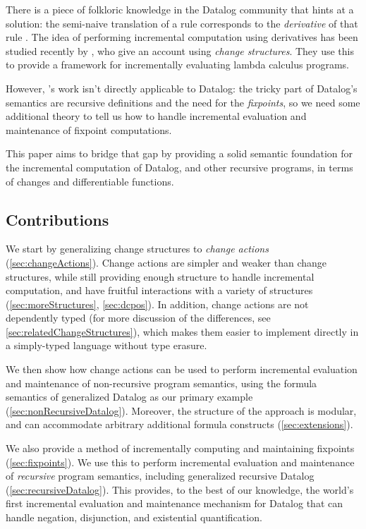 There is a piece of folkloric knowledge in the Datalog community that hints at a
solution: the semi-naive translation of a rule corresponds to the
\emph{derivative} of that rule \autocites{bancilhon1986naive}[section
3.2.2]{bancilhon1986amateur}. The idea of performing incremental computation using derivatives has been
studied recently by \textcite{cai2014changes}, who give an account using
\emph{change structures}. They use this to provide a framework for incrementally evaluating lambda calculus programs.

However, \citeauthor{cai2014changes}'s work isn't directly applicable to Datalog: the tricky part
of Datalog's semantics are recursive definitions and the need for the
\emph{fixpoints}, so we need some additional theory to tell us how to
handle incremental evaluation and maintenance of fixpoint computations.

This paper aims to bridge that gap by providing a solid semantic foundation for the incremental
computation of Datalog, and other recursive programs, in terms of changes and
differentiable functions.

\subsection{Contributions}

We start by generalizing change structures to
\emph{change actions} (\cref{sec:changeActions}). Change actions are simpler and weaker than change
structures, while still providing enough structure to handle incremental
computation, and have fruitful
interactions with a variety of structures (\cref{sec:moreStructures},
\cref{sec:dcpos}). In addition, change actions are not dependently typed (for
more discussion of the differences, see \cref{sec:relatedChangeStructures}),
which makes them easier to implement directly in a simply-typed language without
type erasure.

We then show how change actions can be used to perform incremental evaluation and maintenance
of non-recursive program semantics, using the formula semantics of generalized Datalog as our primary
example (\cref{sec:nonRecursiveDatalog}). Moreover, the structure of the
approach is modular, and can accommodate arbitrary additional
formula constructs (\cref{sec:extensions}).

We also provide a method of incrementally computing and maintaining fixpoints
(\cref{sec:fixpoints}). We use this to perform incremental evaluation and
maintenance of \emph{recursive} program semantics, including generalized
recursive Datalog (\cref{sec:recursiveDatalog}). This provides, to the best
of our knowledge, the world's first incremental
evaluation and maintenance mechanism for Datalog that can handle negation,
disjunction, and existential quantification. 

